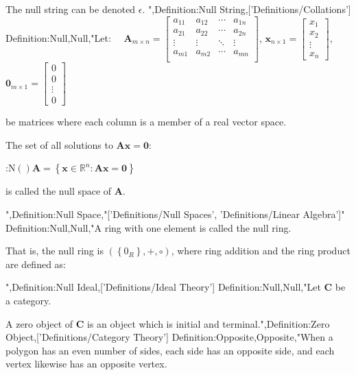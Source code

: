 The null string can be denoted $\epsilon$.
",Definition:Null String,['Definitions/Collations']
Definition:Null,Null,"Let:
$\quad \mathbf A_{m \times n} = \begin {bmatrix}
a_{11} & a_{12} & \cdots & a_{1n} \\
a_{21} & a_{22} & \cdots & a_{2n} \\
\vdots & \vdots & \ddots & \vdots \\
a_{m1} & a_{m2} & \cdots & a_{mn} \\
\end {bmatrix}$,  $\mathbf x_{n \times 1} = \begin {bmatrix} x_1 \\ x_2 \\ \vdots \\ x_n \end {bmatrix}$, $\mathbf 0_{m \times 1} = \begin {bmatrix} 0 \\ 0 \\ \vdots \\ 0 \end {bmatrix}$

be matrices where each column is a member of a real vector space.

The set of all solutions to $\mathbf A \mathbf x = \mathbf 0$:

:$\mathrm N \left(   \right){\mathbf A} = \left\lbrace \mathbf x \in \mathbb R^n : \mathbf {A x} = \mathbf 0 \right\rbrace$

is called the null space of $\mathbf A$.



",Definition:Null Space,"['Definitions/Null Spaces', 'Definitions/Linear Algebra']"
Definition:Null,Null,"A ring with one element is called the null ring.

That is, the null ring is $\left( \left\lbrace 0_R \right\rbrace, +, \circ \right)$, where ring addition and the ring product are defined as:





",Definition:Null Ideal,['Definitions/Ideal Theory']
Definition:Null,Null,"Let $\mathbf C$ be a category.


A zero object of $\mathbf C$ is an object which is initial and terminal.",Definition:Zero Object,['Definitions/Category Theory']
Definition:Opposite,Opposite,"When a polygon has an even number of sides, each side has an opposite side, and each vertex likewise has an opposite vertex.

